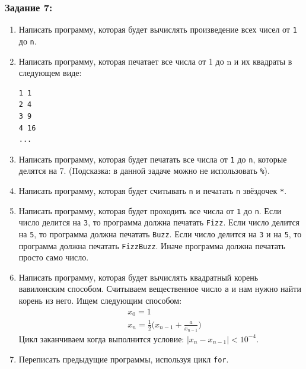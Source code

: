 \documentclass{article}
\begin{document}
\subsubsection*{Задание 7:}
\begin{enumerate}
\item Написать программу, которая будет вычислять произведение всех чисел от \texttt{1} до \texttt{n}.
\item Написать программу, которая печатает все числа от 1 до n и их квадраты в следующем виде:
\begin{verbatim}
1 1
2 4
3 9
4 16
...
\end{verbatim}
\item Написать программу, которая будет печатать все числа от \texttt{1} до \texttt{n}, которые делятся на 7. (Подсказка: в данной задаче можно не использовать \texttt{\%}).
\item Написать программу, которая будет считывать \texttt{n} и печатать \texttt{n} звёздочек \texttt{*}.
\item Написать программу, которая будет проходить все числа от \texttt{1} до \texttt{n}. Если число делится на \texttt{3}, то программа должна печатать \texttt{Fizz}. Если число делится на \texttt{5}, то программа должна печатать \texttt{Buzz}. Если число делится на \texttt{3} и на \texttt{5}, то программа должна печатать \texttt{FizzBuzz}. Иначе программа должна печатать просто само число.
\item Написать программу, которая будет вычислять квадратный корень вавилонским способом. Считываем вещественное число \texttt{a} и нам нужно найти корень из него. Ищем следующим способом:
\begin{align*} 
&x_0 = 1\\
&x_n = \frac{1}{2}\Big(x_{n-1} + \frac{a}{x_{n-1}}\Big)
\end{align*}
Цикл заканчиваем когда выполнится условие: $|x_n - x_{n-1}| < 10^{-4}$.
\item Переписать предыдущие программы, используя цикл \texttt{for}.
\end{enumerate}
\end{document}
